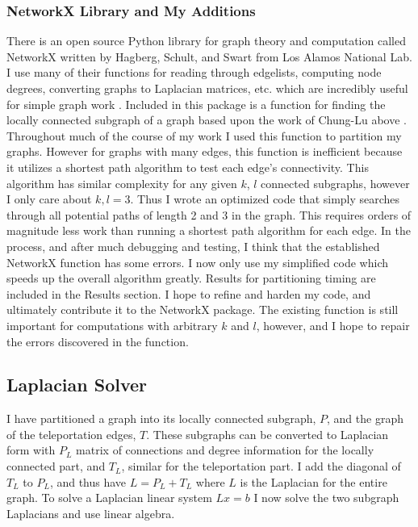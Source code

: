 \documentclass{article}
\begin{document}
\subsubsection{NetworkX Library and My Additions}
There is an open source Python library for graph theory and computation called NetworkX written by Hagberg, Schult, and Swart from Los Alamos National Lab. I use many of their functions for reading through edgelists, computing node degrees, converting graphs to Laplacian matrices, etc. which are incredibly useful for simple graph work \cite{Hagberg:2008}. Included in this package is a function for finding the locally connected subgraph of a graph based upon the work of Chung-Lu above \cite{Chung:2004}. Throughout much of the course of my work I used this function to partition my graphs. However for graphs with many edges, this function is inefficient because it utilizes a shortest path algorithm \cite{Dijkstra:1959} to test each edge's connectivity. This algorithm has similar complexity for any given $k$, $l$ connected subgraphs, however I only care about $k,l = 3$. Thus I wrote an optimized code that simply searches through all potential paths of length 2 and 3 in the graph. This requires orders of magnitude less work than running a shortest path algorithm for each edge. In the process, and after much debugging and testing, I think that the established NetworkX function has some errors. I now only use my simplified code which speeds up the overall algorithm greatly. Results for partitioning timing are included in the Results section. I hope to refine and harden my code, and ultimately contribute it to the NetworkX package. The existing function is still important for computations with arbitrary $k$ and $l$, however, and I hope to repair the errors discovered in the function.

\subsection{Laplacian Solver}
I have partitioned a graph into its locally connected subgraph, $P$, and the graph of the teleportation edges, $T$. These subgraphs can be converted to Laplacian form with $P_L$ matrix of connections and degree information for the locally connected part, and $T_L$, similar for the teleportation part. I add the diagonal of $T_L$ to $P_L$, and thus have $L = P_L + T_L$ where $L$ is the Laplacian for the entire graph. To solve a Laplacian linear system $Lx=b$ I now solve the two subgraph Laplacians and use linear algebra.
\end{document}
